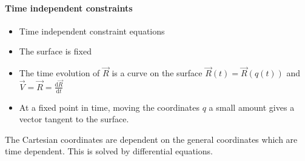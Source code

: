\paragraph{Time independent constraints}
\begin{itemize}
    \item Time independent constraint equations
    \item The surface is fixed
    \item The time evolution of $\vec{R}$ is a curve on the surface $\vec{R}(t) = \vec{R}(q(t))$ and $\vec{V} = \vec{R} = \frac{\mathrm{d}\vec{R}}{\mathrm{d}t}$
    \item At a fixed point in time, moving the coordinates $q$ a small amount gives a vector tangent to the surface. 
\end{itemize}

The Cartesian coordinates are dependent on the general coordinates which are time dependent. This is solved by differential equations. 
